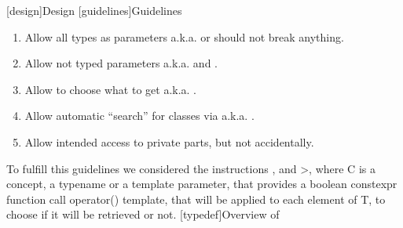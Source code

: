[design]{Design}
[guidelines]{Guidelines}
\begin{enumerate}
\item Allow all types as parameters a.k.a.  or  should not break anything.
\item Allow not typed parameters a.k.a.  and .
\item Allow to choose what to get a.k.a. .
\item Allow automatic ``search'' for classes via  a.k.a. .
\item Allow intended access to private parts, but not accidentally.
\end{enumerate}
To fulfill this guidelines we considered the instructions ,  and >, where C is a concept, a typename or a template parameter, that provides a boolean constexpr function call operator() template, that will be applied to each element of T, to choose if it will be retrieved or not.
[typedef]{Overview of }
